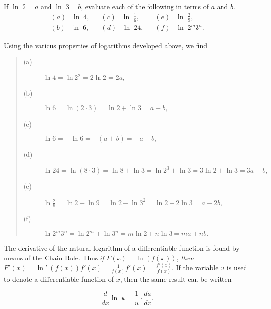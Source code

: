 \begin{example}
If $\ln\; 2 = a$ and $\ln\; 3 = b$, evaluate each of the following in terms of $a$ and $b$.
$$
\begin{array}{lll}
(a)\;\;\; \ln\; 4,  \;\;\;&(c)\;\;\; \ln\; \frac{1}{6},   \;\;\;&(e)\;\;\; \ln\; \frac{2}{9},\\
(b)\;\;\; \ln\; 6,  \;\;\;&(d)\;\;\; \ln\; 24,  \;\;\;&(f)\;\;\; \ln\; 2^{m}3^{n}.
\end{array}
$$

\noindent Using the various properties of logarithms developed above, we find 
 
\begin{quote}
\begin{description}
\item[(a)] $\ln 4 = \ln 2^{2} = 2 \ln 2 = 2a,$
\item[(b)] $\ln 6 = \ln (2 \cdot 3) = \ln 2 + \ln 3 = a + b,$
\item[(c)] $\ln 6 =  - \ln 6 = - (a + b) =  - a - b,$
\item[(d)] $\ln 24 = \ln (8 \cdot 3) = \ln 8 + \ln 3 = \ln 2^{3} + \ln 3 = 3 \ln 2 + \ln 3 = 3a + b,$
\item[(e)] $\ln \frac{2}{9} = \ln 2 - \ln 9 = \ln 2 - \ln 3^{2} = \ln 2 - 2 \ln 3 = a - 2b,$ 
\item[(f)] $\ln 2^{m}3^{n} = \ln 2^{m} + \ln 3^{n} = m \ln 2 + n \ln 3 = ma + nb.$

\end{description}
\end{quote} 
\end{example}

The derivative of the natural logarithm of a differentiable function is found by means of the Chain Rule. Thus \textit{if} $F(x) = \ln(f(x))$, \textit{then} $F'(x) = \ln'\; (f(x))f' (x) = \frac{1}{f(x)} f'(x) = \frac{f'(x)}{f(x)}$. If the variable $u$ is used to denote a differentiable function of $x$, then the same result can be written

$$
\frac{d}{dx} \ln\; u = \frac{1}{u} \cdot \frac{du}{dx}.
$$
\medskip

